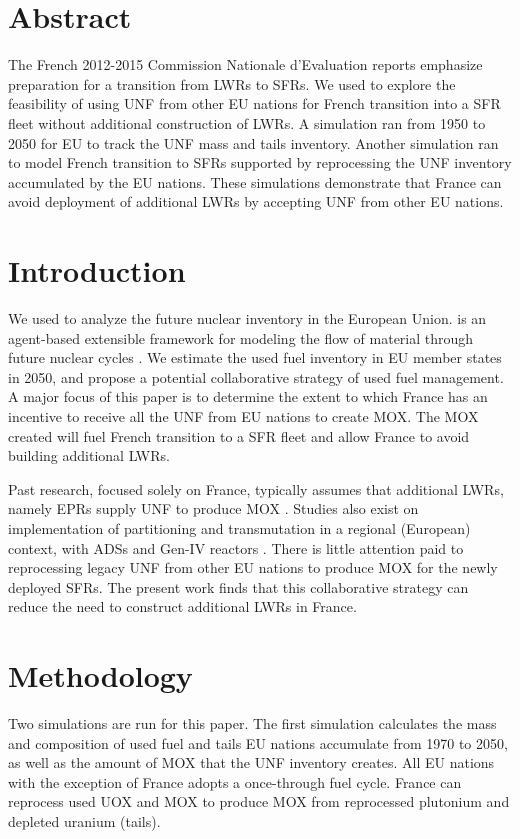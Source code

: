 \section{Abstract}
The French 2012-2015 Commission Nationale d'Evaluation reports
\cite{cne2_reports_2015} emphasize preparation for a transition from \glspl{LWR} to \glspl{SFR}.
We used \Cyclus \cite{huff_fundamental_2016} to explore the feasibility of using \gls{UNF} from other EU nations
for French transition into a \gls{SFR} fleet without additional construction of \glspl{LWR}.
A \Cyclus simulation ran from 1950 to 2050 for EU to track the \gls{UNF} mass
and tails inventory. Another simulation ran to model French
transition to \glspl{SFR} supported by reprocessing the \gls{UNF} inventory accumulated by the \gls{EU} nations.
These simulations demonstrate that France can avoid deployment
of additional \glspl{LWR} by accepting \gls{UNF} from other EU nations.


\section{Introduction}
We used \Cyclus to analyze
the future nuclear inventory in the European Union. \Cyclus is an agent-based extensible
framework for modeling the flow of material through future nuclear cycles .
We estimate the used fuel
inventory in \gls{EU} member states in 2050, and propose a potential collaborative strategy of used fuel
management.
A major focus of this paper is to determine the extent to which France has an incentive
to receive all the \gls{UNF} from \gls{EU} nations to create \gls{MOX}.
The \gls{MOX} created will fuel French transition to a \gls{SFR} fleet
and allow France to avoid building additional \glspl{LWR}.

Past research, focused solely on France, typically assumes that additional \glspl{LWR},
namely \glspl{EPR} supply \gls{UNF} to produce \gls{MOX} \cite{carre_overview_2009, martin_symbiotic_2017, freynet_multiobjective_2016}.
Studies also exist on implementation of partitioning and transmutation
in a regional (European) context, with \glspl{ADS} and Gen-IV reactors \cite{fazio_study_2013}.
There is little attention paid to reprocessing legacy \gls{UNF} from other
EU nations to produce \gls{MOX} for the newly deployed \glspl{SFR}.
The present work finds that this collaborative strategy can reduce the
need to construct additional \glspl{LWR} in France.

\section{Methodology}
Two \Cyclus simulations are run for this paper. 
The first simulation calculates
the mass and composition of used fuel and tails \gls{EU} nations accumulate from 1970 to 2050,
as well as the amount of \gls{MOX} that the \gls{UNF} inventory creates.
All EU nations with the exception of France adopts a once-through fuel cycle.
France can reprocess used \gls{UOX} and \gls{MOX} to
produce \gls{MOX} from reprocessed plutonium and depleted uranium (tails).

